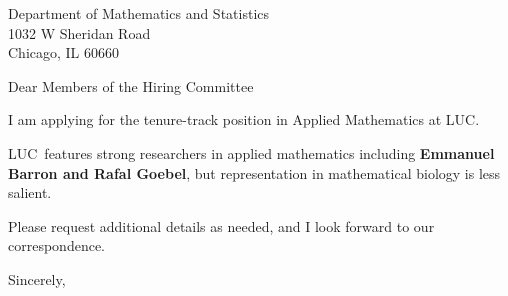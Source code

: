 




	
	
	\def\School{LUC}
	
	\begin{letter}
		{Department of Mathematics and Statistics\\
			1032 W Sheridan Road\\
			Chicago, IL 60660
		}
		
		\opening{Dear Members of the Hiring Committee}
		
		
		I am applying for the tenure-track position in Applied Mathematics at \School. 
		
		\School~features strong researchers in applied mathematics including \textbf{Emmanuel Barron and Rafal Goebel}, but representation in mathematical biology is less salient. 
		
		
		
		
		
		Please request additional details as needed, and I look forward to our correspondence.
		
		\closing{Sincerely,}
	\end{letter}
